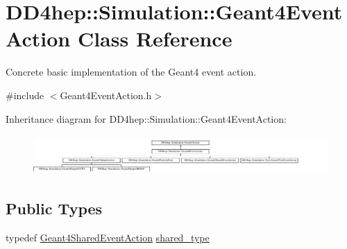 \hypertarget{class_d_d4hep_1_1_simulation_1_1_geant4_event_action}{}\section{D\+D4hep\+:\+:Simulation\+:\+:Geant4\+Event\+Action Class Reference}
\label{class_d_d4hep_1_1_simulation_1_1_geant4_event_action}


Concrete basic implementation of the Geant4 event action.  




{\ttfamily \#include $<$Geant4\+Event\+Action.\+h$>$}

Inheritance diagram for D\+D4hep\+:\+:Simulation\+:\+:Geant4\+Event\+Action\+:\begin{figure}[H]
\begin{center}
\leavevmode
\includegraphics[height=1.518644cm]{class_d_d4hep_1_1_simulation_1_1_geant4_event_action}
\end{center}
\end{figure}
\subsection*{Public Types}
\begin{DoxyCompactItemize}
\item 
typedef \hyperlink{class_d_d4hep_1_1_simulation_1_1_geant4_shared_event_action}{Geant4\+Shared\+Event\+Action} \hyperlink{class_d_d4hep_1_1_simulation_1_1_geant4_event_action_abef0506a1372b5723ccfb84ec11675e4}{shared\+\_\+type}
\end{DoxyCompactItemize}
